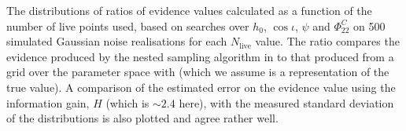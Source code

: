 \label{fig:nest_evs}
The distributions of ratios of evidence values calculated as a function of the number of live points used, based on searches over $h_0$, $\cos{\iota}$,
$\psi$ and $\Phi_{22}^C$ on 500 simulated Gaussian noise realisations for each $N_{\text{live}}$ value. The ratio compares the evidence produced by the
nested sampling algorithm in \lppen to that produced from a grid over the parameter space with \lppe (which we assume is a representation of the
true value). A comparison of the estimated error on the evidence value using the information gain, $H$ (which is $\sim 2.4$ here), with the measured
standard deviation of the distributions is also plotted and agree rather well.
